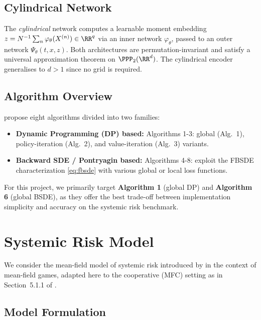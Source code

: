\documentclass[11pt]{article}
\begin{document}
\subsection{Cylindrical Network}

The \emph{cylindrical} network computes a learnable moment embedding $z = N^{-1}\sum_n \varphi_\theta(X^{(n)}) \in \RR^q$ via an inner network $\varphi_\theta$, passed to an outer network $\Psi_\theta(t, x, z)$. Both architectures are permutation-invariant and satisfy a universal approximation theorem on $\PPP_2(\RR^d)$. The cylindrical encoder generalises to $d > 1$ since no grid is required.

\subsection{Algorithm Overview}

\citet{pham2024mfnn} propose eight algorithms divided into two families:
\begin{itemize}
  \item \textbf{Dynamic Programming (DP) based:} Algorithms 1-3: global (Alg.~1), policy-iteration (Alg.~2), and value-iteration (Alg.~3) variants.
  \item \textbf{Backward SDE / Pontryagin based:} Algorithms 4-8: exploit the FBSDE characterization \eqref{eq:fbsde} with various global or local loss functions.
\end{itemize}

For this project, we primarily target \textbf{Algorithm 1} (global DP) and \textbf{Algorithm 6} (global BSDE), as they offer the best trade-off between implementation simplicity and accuracy on the systemic risk benchmark.


\section{Systemic Risk Model}\label{sec:appendix-systemic}

We consider the mean-field model of systemic risk introduced by \citet{carmona2015systemic} in the context of mean-field games, adapted here to the cooperative (MFC) setting as in Section~5.1.1 of \citet{pham2024mfnn}.

\subsection{Model Formulation}
\end{document}
